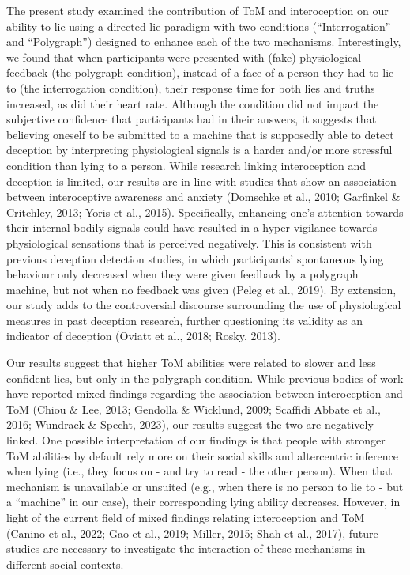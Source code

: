 \documentclass[
  man,mask,floatsintext]{apa6}
\begin{document}
The present study examined the contribution of ToM and interoception on our ability to lie using a directed lie paradigm with two conditions (``Interrogation'' and ``Polygraph'') designed to enhance each of the two mechanisms. Interestingly, we found that when participants were presented with (fake) physiological feedback (the polygraph condition), instead of a face of a person they had to lie to (the interrogation condition), their response time for both lies and truths increased, as did their heart rate. Although the condition did not impact the subjective confidence that participants had in their answers, it suggests that believing oneself to be submitted to a machine that is supposedly able to detect deception by interpreting physiological signals is a harder and/or more stressful condition than lying to a person. While research linking interoception and deception is limited, our results are in line with studies that show an association between interoceptive awareness and anxiety (Domschke et al., 2010; Garfinkel \& Critchley, 2013; Yoris et al., 2015). Specifically, enhancing one's attention towards their internal bodily signals could have resulted in a hyper-vigilance towards physiological sensations that is perceived negatively. This is consistent with previous deception detection studies, in which participants' spontaneous lying behaviour only decreased when they were given feedback by a polygraph machine, but not when no feedback was given (Peleg et al., 2019). By extension, our study adds to the controversial discourse surrounding the use of physiological measures in past deception research, further questioning its validity as an indicator of deception (Oviatt et al., 2018; Rosky, 2013).

Our results suggest that higher ToM abilities were related to slower and less confident lies, but only in the polygraph condition. While previous bodies of work have reported mixed findings regarding the association between interoception and ToM (Chiou \& Lee, 2013; Gendolla \& Wicklund, 2009; Scaffidi Abbate et al., 2016; Wundrack \& Specht, 2023), our results suggest the two are negatively linked. One possible interpretation of our findings is that people with stronger ToM abilities by default rely more on their social skills and altercentric inference when lying (i.e., they focus on - and try to read - the other person). When that mechanism is unavailable or unsuited (e.g., when there is no person to lie to - but a ``machine'' in our case), their corresponding lying ability decreases. However, in light of the current field of mixed findings relating interoception and ToM (Canino et al., 2022; Gao et al., 2019; Miller, 2015; Shah et al., 2017), future studies are necessary to investigate the interaction of these mechanisms in different social contexts.
\end{document}
